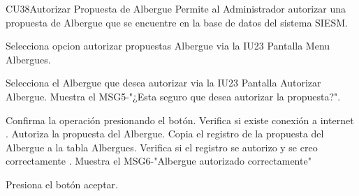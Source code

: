 \begin{UseCase}{CU38}{Autorizar Propuesta de Albergue}{
		Permite al Administrador autorizar una propuesta de Albergue que se encuentre en la base de datos del sistema SIESM.\\
}
	
\end{UseCase}



\begin{UCtrayectoria}
	\item\UCactor Selecciona opcion autorizar propuestas Albergue via la IU23 Pantalla Menu Albergues.
	\item\UCactor Selecciona el Albergue que desea autorizar via la IU23 Pantalla Autorizar Albergue.
	\UCpaso Muestra el MSG5-"¿Esta seguro que desea autorizar la propuesta?".
	\item\UCactor Confirma la operación presionando el botón.
	\UCpaso Verifica si existe conexión a internet .
	\UCpaso Autoriza la propuesta del Albergue.
	\UCpaso Copia el registro de la propuesta del Albergue a la tabla Albergues.
	\UCpaso Verifica si el registro se autorizo y se creo correctamente .
	\UCpaso Muestra el MSG6-"Albergue autorizado correctamente"
	\item\UCactor Presiona el botón aceptar.
\end{UCtrayectoria}


